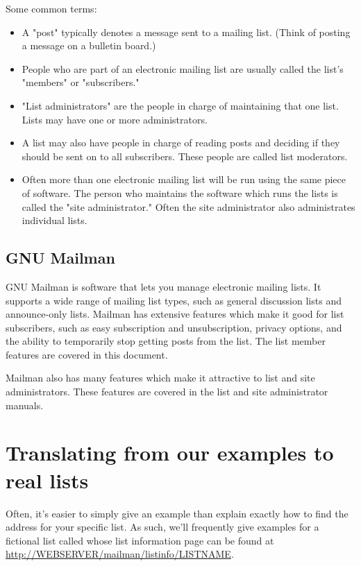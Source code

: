 \documentclass{howto}
\begin{document}
Some common terms:
\begin{itemize}
	\item A "post" typically denotes a message sent to a mailing list.  
	(Think of posting a message on a bulletin board.)
	\item People who are part of an electronic mailing list are usually called 
	the list's "members" or "subscribers."  
	\item  "List administrators" are the people in charge of maintaining that 
	one list.  Lists may have one or more administrators.
	\item A list may also have people in charge of reading posts and deciding
	if they should be sent on to all subscribers.  These people are called
	list moderators.
	\item Often more than one electronic mailing list will be run using the same
	piece of software.  The person who maintains the software which runs
	the lists is called the "site administrator."  Often the site administrator
	also administrates individual lists.
\end{itemize}
\subsection{GNU Mailman}

GNU Mailman is software that lets you manage electronic mailing lists. It
supports a wide range of mailing list types, such as general discussion
lists and announce-only lists.  Mailman has extensive features which make it
good for list subscribers, such as easy subscription and unsubscription, 
privacy options, and the ability to temporarily stop getting posts from the 
list.  The list member features are covered in this document.

Mailman also has many features which make it attractive to list and site 
administrators.  These features are covered in the list and site administrator
manuals.

\section{Translating from our examples to real lists}

Often, it's easier to simply give an example than explain exactly how
to find the address for your specific list.  As such, we'll frequently 
give examples for a fictional list called 
 whose list information page can be found at
\url{http://WEBSERVER/mailman/listinfo/LISTNAME}.  
\end{document}
